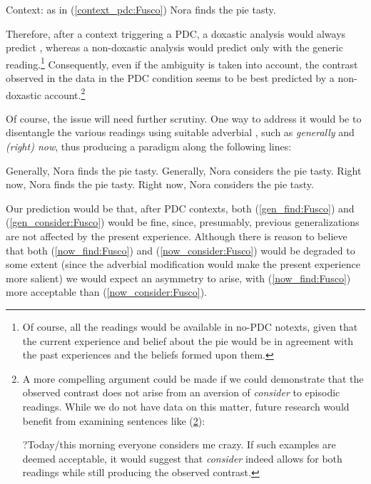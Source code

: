 \documentclass[output=paper,colorlinks,citecolor=brown]{langscibook}
\begin{document}
\ea Context: as in (\ref{context_pdc:Fusco})
\z
\ea Nora finds the pie tasty.
 \label{gen_think_tasty:Fusco} 
 \label{gen_taste_good:Fusco}
 \label{now_think_tasty:Fusco}
 \label{now_taste_good:Fusco}
\z
\z

Therefore, after a context triggering a PDC, a doxastic analysis would always predict , whereas a non-doxastic analysis would predict  only with the generic reading.\footnote{Of course, all the readings would be available in no-PDC notexts, given that the current experience and belief about the pie would be in agreement with the past experiences and the beliefs formed upon them.} Consequently, even if the ambiguity is taken into account, the contrast observed in the data in the PDC condition seems to be best predicted by a non-doxastic account.\footnote{A more compelling argument could be made if we could demonstrate that the observed contrast does not arise from an aversion of \textit{consider} to episodic readings. While we do not have data on this matter, future research would benefit from examining sentences like (\ref{ex:crazy:Fusco}):%

\ea ?Today/this morning everyone considers me crazy.\label{ex:crazy:Fusco}%
\z
If such examples are deemed acceptable, it would suggest that \textit{consider} indeed allows for both readings while still producing the observed contrast.
} 

Of course, the issue will need further scrutiny. One way to address it would be to disentangle the various readings using suitable adverbial , such as \textit{generally} and \textit{(right) now}, thus producing a paradigm along the following lines:

\ea Generally, Nora finds the pie tasty. \label{gen_find:Fusco}
\ex Generally, Nora considers the pie tasty. \label{gen_consider:Fusco}
\ex Right now, Nora finds the pie tasty. \label{now_find:Fusco}
\ex Right now, Nora considers the pie tasty. \label{now_consider:Fusco}
\z

Our prediction would be that, after PDC contexts, both (\ref{gen_find:Fusco}) and (\ref{gen_consider:Fusco}) would be fine, since, presumably, previous generalizations are not affected by the present experience. Although there is reason to believe that both (\ref{now_find:Fusco}) and (\ref{now_consider:Fusco}) would be degraded to some extent (since the adverbial modification would make the present experience more salient)  we would expect an asymmetry to arise, with (\ref{now_find:Fusco}) more acceptable than (\ref{now_consider:Fusco}). 
\end{document}
